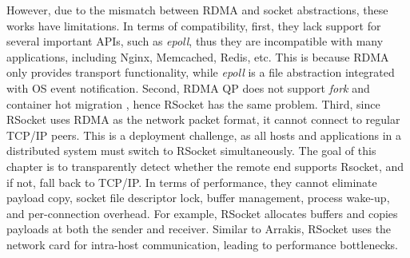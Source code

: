 However, due to the mismatch between RDMA and socket abstractions, these works have limitations. 
In terms of compatibility, first, they lack support for several important APIs, such as \textit{epoll}, thus they are incompatible with many applications, including Nginx, Memcached, Redis, etc. 
This is because RDMA only provides transport functionality, while \textit{epoll} is a file abstraction integrated with OS event notification. 
Second, RDMA QP does not support \textit{fork} and container hot migration \cite{nsdi19freeflow}, hence RSocket has the same problem. 
Third, since RSocket uses RDMA as the network packet format, it cannot connect to regular TCP/IP peers. 
This is a deployment challenge, as all hosts and applications in a distributed system must switch to RSocket simultaneously. 
The goal of this chapter is to transparently detect whether the remote end supports Rsocket, and if not, fall back to TCP/IP. 
In terms of performance, they cannot eliminate payload copy, socket file descriptor lock, buffer management, process wake-up, and per-connection overhead. 
For example, RSocket allocates buffers and copies payloads at both the sender and receiver. 
Similar to Arrakis, RSocket uses the network card for intra-host communication, leading to performance bottlenecks.

